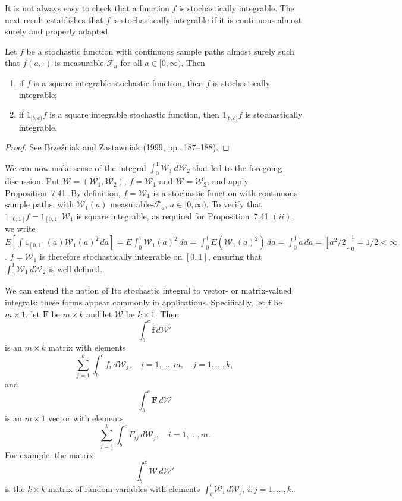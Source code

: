 It is not always easy to check that a function $f$ is stochastically integrable. The next result establishes that $f$ is stochastically integrable if it is continuous almost surely and properly adapted.

\begin{proposition}\label{prop:continuous-integrable}
Let $f$ be a stochastic function with continuous sample paths almost surely such that $f(a, \cdot)$ is measurable-$\mathcal{F}_a$ for all $a \in [0,\infty)$. Then
\begin{enumerate}[label=(\roman*)]
\item if $f$ is a square integrable stochastic function, then $f$ is stochastically integrable;
\item if $1_{[b,c)} f$ is a square integrable stochastic function, then $1_{[b,c)} f$ is stochastically integrable.
\end{enumerate}
\end{proposition}

\begin{proof}
See Brze\'{z}niak and Zastawniak (1999, pp.\ 187--188).
\end{proof}

We can now make sense of the integral $\int_0^1 \mathcal{W}_1\,d\mathcal{W}_2$ that led to the foregoing discussion. Put $\boldsymbol{\mathcal{W}} = (\mathcal{W}_1, \mathcal{W}_2)$, $f = \mathcal{W}_1$ and $\mathcal{W} = \mathcal{W}_2$, and apply Proposition~7.41. By definition, $f = \mathcal{W}_1$ is a stochastic function with continuous sample paths, with $\mathcal{W}_1(a)$ measurable-$\mathcal{F}_a$, $a \in [0,\infty)$. To verify that $1_{[0,1]} f = 1_{[0,1]} \mathcal{W}_1$ is square integrable, as required for Proposition~7.41 $(ii)$, we write $E\left[\int 1_{[0,1]}(a)\mathcal{W}_1(a)^2\,da\right] = E\int_0^1 \mathcal{W}_1(a)^2\,da = \int_0^1 E(\mathcal{W}_1(a)^2)\,da = \int_0^1 a\,da = [a^2/2]_0^1 = 1/2 < \infty$. $f = \mathcal{W}_1$ is therefore stochastically integrable on $[0,1]$, ensuring that $\int_0^1 \mathcal{W}_1\,d\mathcal{W}_2$ is well defined.

We can extend the notion of Ito stochastic integral to vector- or matrix-valued integrals; these forms appear commonly in applications. Specifically, let $\mathbf{f}$ be $m \times 1$, let $\mathbf{F}$ be $m \times k$ and let $\boldsymbol{\mathcal{W}}$ be $k \times 1$. Then
\[
\int_b^c \mathbf{f}\,d\boldsymbol{\mathcal{W}}'
\]
is an $m \times k$ matrix with elements
\[
\sum_{j=1}^{k} \int_b^c f_i\,d\mathcal{W}_j, \quad i = 1, \ldots, m, \quad j = 1, \ldots, k,
\]
and
\[
\int_b^c \mathbf{F}\,d\boldsymbol{\mathcal{W}}
\]
is an $m \times 1$ vector with elements
\[
\sum_{j=1}^{k} \int_b^c F_{ij}\,d\mathcal{W}_j, \quad i = 1, \ldots, m.
\]
For example, the matrix
\[
\int_b^c \boldsymbol{\mathcal{W}}\,d\boldsymbol{\mathcal{W}}'
\]
is the $k \times k$ matrix of random variables with elements $\int_b^c \mathcal{W}_i\,d\mathcal{W}_j$, $i, j = 1, \ldots, k$.

